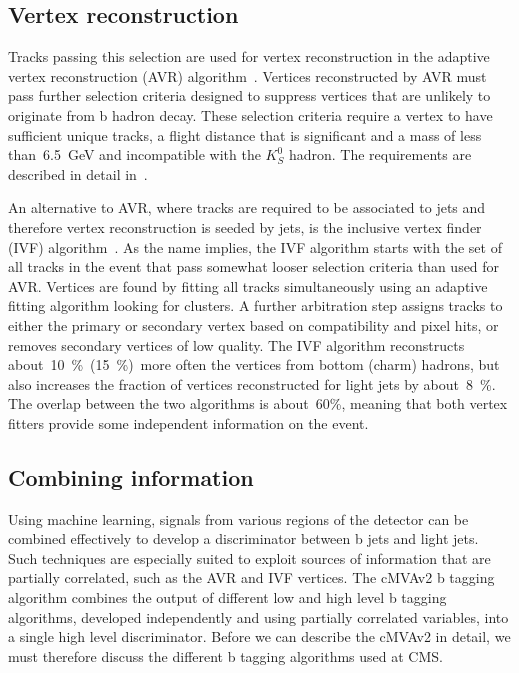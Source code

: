\subsection{Vertex reconstruction}
Tracks passing this selection are used for vertex reconstruction in the adaptive vertex reconstruction (AVR) algorithm~\cite{}. Vertices reconstructed by AVR must pass further selection criteria designed to suppress vertices that are unlikely to originate from b hadron decay. These selection criteria require a vertex to have sufficient unique tracks, a flight distance that is significant and a mass of less than~6.5~GeV and incompatible with the $K_S^0$ hadron. The requirements are described in detail in~\cite{CMS-PAS-BTV-15-001}.

An alternative to AVR, where tracks are required to be associated to jets and therefore vertex reconstruction is seeded by jets, is the inclusive vertex finder (IVF) algorithm~\cite{}. As the name implies, the IVF algorithm starts with the set of all tracks in the event that pass somewhat looser selection criteria than used for AVR. Vertices are found by fitting all tracks simultaneously using an adaptive fitting algorithm looking for clusters. A further arbitration step assigns tracks to either the primary or secondary vertex based on compatibility and pixel hits, or removes secondary vertices of low quality. The IVF algorithm reconstructs about~10~\%~(15~\%)~more often the vertices from bottom (charm) hadrons, but also increases the fraction of vertices reconstructed for light jets by about~8~\%. The overlap between the two algorithms is about~60\%, meaning that both vertex fitters provide some independent information on the event.

\subsection{Combining information}
Using machine learning, signals from various regions of the detector can be combined effectively to develop a discriminator between b jets and light jets. Such techniques are especially suited to exploit sources of information that are partially correlated, such as the AVR and IVF vertices. The cMVAv2 b tagging algorithm combines the output of different low and high level b tagging algorithms, developed independently and using partially correlated variables, into a single high level discriminator. Before we can describe the cMVAv2 in detail, we must therefore discuss the different b tagging algorithms used at CMS.

